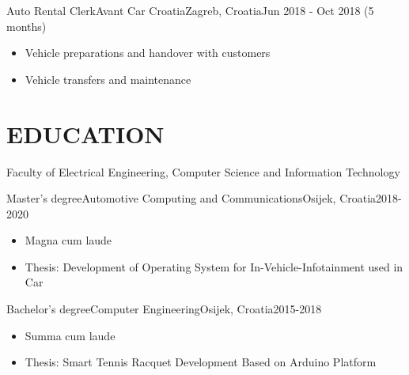 \documentclass[10pt, a4paper]{article}
\begin{document}

\begin{cvitem}{Auto Rental Clerk}{Avant Car Croatia}{Zagreb, Croatia}{Jun 2018 - Oct 2018 (5 months)}
    \begin{itemize}
        \item Vehicle preparations and handover with customers
        \item Vehicle transfers and maintenance
    \end{itemize}
\end{cvitem}
    
\section{EDUCATION}


Faculty of Electrical Engineering, Computer Science and Information Technology\\
\begin{cvitem}{Master's degree}{Automotive Computing and Communications}{Osijek, Croatia}{2018-2020}
    \begin{itemize}
        \item Magna cum laude
        \item Thesis: Development of Operating System for In-Vehicle-Infotainment used in Car
    \end{itemize}
\end{cvitem}

\begin{cvitem}{Bachelor's degree}{Computer Engineering}{Osijek, Croatia}{2015-2018}
    \begin{itemize}
        \item Summa cum laude
        \item Thesis: Smart Tennis Racquet Development Based on Arduino Platform
    \end{itemize}
\end{cvitem}
\end{document}
